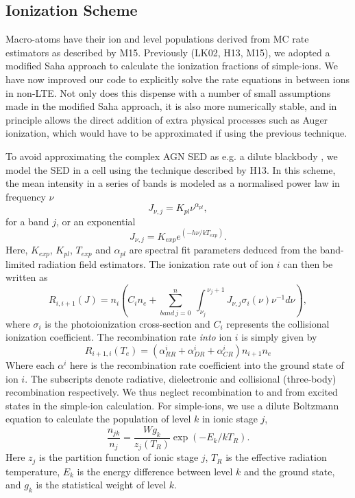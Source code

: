 \documentclass[preprint, a4paper, 11pt]{aastex}
\begin{document}
\subsection{Ionization Scheme}

Macro-atoms have their ion and level populations derived from
MC rate estimators as described by M15. Previously (LK02, H13, M15),
we adopted a modified Saha approach to calculate the ionization fractions
of simple-ions. We have now improved our code to explicitly solve the 
rate equations in between ions in non-LTE. 
Not only does this
dispense with a number of small assumptions made in the modified Saha approach, 
it is also more numerically stable, 
and in principle allows the direct addition of extra physical 
processes such as Auger ionization, which would have to be approximated 
if using the previous technique.

To avoid approximating the complex AGN SED as e.g. a dilute blackbody \citep[][M15]{ML93},
we model the SED in a cell using the technique described by H13. In this scheme,
the mean intensity in a series of bands is modeled as a normalised power law in 
frequency $\nu$
\begin{equation}
J_{\nu,j}=K_{pl}\nu^{\alpha_{pl}},
\end{equation}
for a band $j$, or an exponential 
\begin{equation}
J_{\nu,j}=K_{exp} e^{(-h\nu/k T_{exp})}.
\end{equation}
Here, $K_{exp}$, $K_{pl}$, $T_{exp}$ and $\alpha_{pl}$ are spectral fit parameters
deduced from the band-limited radiation field estimators.
The ionization rate out of ion $i$ can then be written as 
\begin{equation}
R_{i,i+1}(J)= 
\displaystyle{
n_i \left(C_{i} n_e + 
\sum_{band~j=0}^{n}~
{\int_{\nu_j}^{~\nu_j+1}{J_{\nu,j}\sigma_i(\nu)\nu^{-1}d\nu}}
\right),}
\end{equation}
where $\sigma_i$ is the photoionization cross-section and $C_{i}$
represents the collisional ionization coefficient.
The recombination rate {\em into} ion $i$ is simply given by 
\begin{equation}
R_{i+1,i}(T_e) = (\alpha^i_{RR} + \alpha^i_{DR} + \alpha^i_{CR}) n_{i+1} n_e
\end{equation}
Where each $\alpha^i$ here is the recombination rate coefficient into the ground state of ion $i$.
The subscripts denote radiative, dielectronic and 
collisional (three-body) recombination respectively.
We thus neglect recombination to and from excited states in the simple-ion calculation. 
For simple-ions, we use a dilute Boltzmann equation to calculate 
the population of level $k$ in ionic stage $j$,
\begin{equation}
\frac{n_{jk}}{n_j} = \frac{W g_k}{z_j(T_R)} \exp(-E_k/kT_R).
\end{equation}
Here $z_j$ is the partition function of ionic stage $j$,
$T_R$ is the effective radiation temperature,
$E_k$ is the energy difference between level $k$ and the ground state,
and $g_k$ is the statistical weight of level $k$. 
\end{document}

